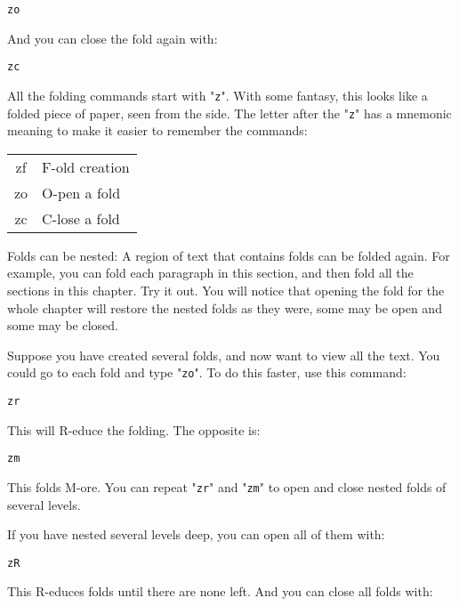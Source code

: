\begin{Verbatim}[samepage=true]
 zo
\end{Verbatim}

And you can close the fold again with:

\begin{Verbatim}[samepage=true]
 zc
\end{Verbatim}

All the folding commands start with "\verb!z!".
With some fantasy, this looks like a folded piece of paper, seen from the side.
The letter after the "\verb!z!" has a mnemonic meaning to make it easier to remember the commands:
\begin{center} \begin{tabular}{c l}
				zf & F-old creation \\
				zo & O-pen a fold \\
				zc & C-lose a fold \\
\end{tabular} \end{center}

Folds can be nested: A region of text that contains folds can be folded again.
For example, you can fold each paragraph in this section, and then fold all the sections in this chapter.
Try it out.
You will notice that opening the fold for the whole chapter will restore the nested folds as they were, some may be open and some may be closed.

Suppose you have created several folds, and now want to view all the text.
You could go to each fold and type "\verb!zo!".
To do this faster, use this command:

\begin{Verbatim}[samepage=true]
 zr
\end{Verbatim}

This will R-educe the folding.
The opposite is:

\begin{Verbatim}[samepage=true]
 zm
\end{Verbatim}

This folds M-ore.
You can repeat "\verb!zr!" and "\verb!zm!" to open and close nested folds of several levels.

If you have nested several levels deep, you can open all of them with:

\begin{Verbatim}[samepage=true]
 zR
\end{Verbatim}

This R-educes folds until there are none left.
And you can close all folds with:

